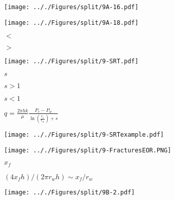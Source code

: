 \documentclass[onecolumn,11pt]{report}
\def\lthtmlcheckvsize{\ifdim\ht\sizebox<\vsize 
  \ifdim\wd\sizebox<\hsize\expandafter\hfill\fi \expandafter\vfill
  \else\expandafter\vss\fi}%
\begin{document}
{\newpage\clearpage
{}%
\texttt{[image: .././Figures/split/9A-16.pdf]}%
\lthtmlpictureZ
\lthtmlcheckvsize\clearpage}

{\newpage\clearpage
{}%
\texttt{[image: .././Figures/split/9A-18.pdf]}%
\lthtmlpictureZ
\lthtmlcheckvsize\clearpage}

{\newpage\clearpage
{}%
$ <$%
\lthtmlindisplaymathZ
\lthtmlcheckvsize\clearpage}

{\newpage\clearpage
{}%
$ >$%
\lthtmlindisplaymathZ
\lthtmlcheckvsize\clearpage}

{\newpage\clearpage
{}%
\texttt{[image: .././Figures/split/9-SRT.pdf]}%
\lthtmlpictureZ
\lthtmlcheckvsize\clearpage}

{\newpage\clearpage
{}%
$ s$%
\lthtmlindisplaymathZ
\lthtmlcheckvsize\clearpage}

{\newpage\clearpage
{}%
$ s>1$%
\lthtmlindisplaymathZ
\lthtmlcheckvsize\clearpage}

{\newpage\clearpage
{}%
$ s<1$%
\lthtmlindisplaymathZ
\lthtmlcheckvsize\clearpage}

{\newpage\clearpage
{}%
$\displaystyle q = \frac{2 \pi h k} {\mu} \frac{P_e - P_w}{\ln (\frac{r_e}{r_w})+s}$%
\lthtmlindisplaymathZ
\lthtmlcheckvsize\clearpage}

{\newpage\clearpage
{}%
\texttt{[image: .././Figures/split/9-SRTexample.pdf]}%
\lthtmlpictureZ
\lthtmlcheckvsize\clearpage}

{\newpage\clearpage
{}%
\texttt{[image: .././Figures/split/9-FracturesEOR.PNG]}%
\lthtmlpictureZ
\lthtmlcheckvsize\clearpage}

{\newpage\clearpage
{}%
$ x_f$%
\lthtmlindisplaymathZ
\lthtmlcheckvsize\clearpage}

{\newpage\clearpage
{}%
$ (4 x_f h)/(2\pi r_w h) \sim x_f/r_w$%
\lthtmlindisplaymathZ
\lthtmlcheckvsize\clearpage}

{\newpage\clearpage
{}%
\texttt{[image: .././Figures/split/9B-2.pdf]}%
\lthtmlpictureZ
\lthtmlcheckvsize\clearpage}
\end{document}
